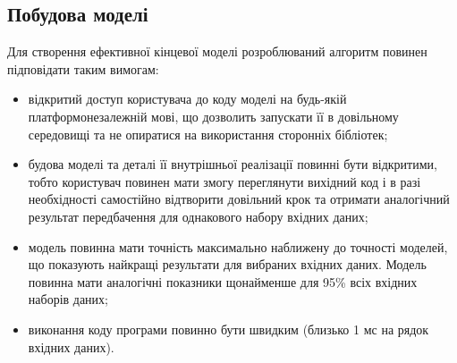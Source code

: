 \subsection{Побудова моделі}
Для створення ефективної кінцевої моделі розроблюваний алгоритм повинен підповідати таким вимогам:
\begin{itemize}  
	\item відкритий доступ користувача до коду моделі на будь-якій платформонезалежній мові, що дозволить запускати її в довільному середовищі та не опиратися на використання сторонніх бібліотек;
	\item будова моделі та деталі її внутрішньої реалізації повинні бути відкритими, тобто користувач повинен мати змогу переглянути вихідний код і в разі необхідності самостійно відтворити довільний крок та отримати аналогічний результат передбачення для однакового набору вхідних даних;
	\item модель повинна мати точність максимально наближену до точності моделей, що показують найкращі результати для вибраних вхідних даних. Модель повинна мати аналогічні показники щонайменше для 95\% всіх вхідних наборів даних;
	\item виконання коду програми повинно бути швидким (близько 1 мс на рядок вхідних даних).
\end{itemize}

